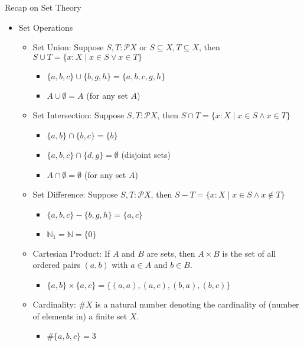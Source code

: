 \documentclass[aspectratio=169]{beamer}
\begin{document}
\begin{frame}{Recap on Set Theory}
    \begin{itemize}
        \item Set Operations
        \begin{itemize}
            \item Set Union: Suppose $S, T : \mathcal{P} X$ or $S \subseteq X, T \subseteq X$, then $S \cup T = \{x : X \mid x \in S \vee x \in T\}$
            \begin{itemize}
                \item $\{a, b, c\} \cup \{b, g, h\} = \{a, b, c,g, h\}$
                \item $A \cup \emptyset = A$ (for any set $A$)
            \end{itemize}
            \item Set Intersection: Suppose $S, T : \mathcal{P} X$, then $S \cap T = \{x : X \mid x \in S \wedge x \in T\}$ 
            \begin{itemize}
                \item $\{a, b\} \cap \{b, c\} = \{b\}$
                \item $\{a, b, c\} \cap \{d, g\} = \emptyset$ (disjoint sets)
                \item $A \cap \emptyset = \emptyset$ (for any set $A$)
            \end{itemize}
            \item Set Difference: Suppose $S, T : \mathcal{P} X$, then $S - T = \{x : X \mid x \in S \wedge x \not \in T\}$ 
            \begin{itemize}
                \item $\{a, b, c\} - \{b, g, h\} = \{a, c\}$
                \item $\mathbb{N}_{1} = \mathbb{N} = \{0\}$
            \end{itemize}
            \item Cartesian Product: If $A$ and $B$ are sets, then $A \times B$ is the set of all ordered pairs $(a, b)$ with $a \in A$ and $b \in B$.
            \begin{itemize}
                \item $\{a, b\} \times \{a, c\} = \{(a, a), (a, c), (b, a), (b, c)\}$
            \end{itemize}
            \item Cardinality: $\#X$ is a natural number denoting the cardinality of (number of elements in) a finite set $X$.
            \begin{itemize}
                \item $\#\{a, b, c\} = 3$
            \end{itemize}
        \end{itemize}
    \end{itemize}
\end{frame}
\end{document}
